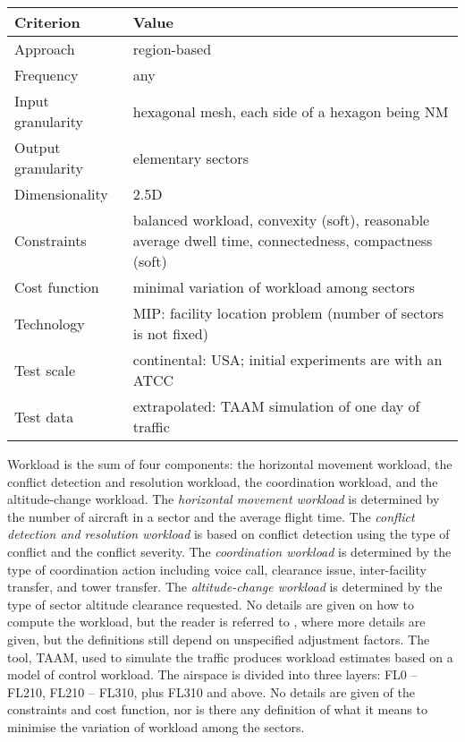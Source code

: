 \documentclass[a4paper,12pt]{article}
\begin{document}
\begin{center}
\begin{tabular}{|l|l|}
  \hline
  Criterion & Value \\
  \hline\hline
  Approach & region-based \\ \hline
  Frequency & any \\ \hline
  Input granularity & hexagonal mesh, each side of a hexagon
    being  NM \\ \hline
  Output granularity & elementary sectors \\ \hline
  Dimensionality & 2.5D \\ \hline
  Constraints & \parbox{11.5cm}{balanced workload, convexity (soft),
    reasonable average dwell time, connectedness, compactness (soft)} \\ \hline
  Cost function & minimal variation of workload among sectors \\ \hline
  Technology & MIP: facility location problem (number of sectors is
    not fixed) \\ \hline
  Test scale & continental: USA; initial experiments are with an
    ATCC \\ \hline
  Test data & extrapolated: TAAM simulation of one day of traffic \\ \hline
\end{tabular}
\end{center}
Workload is the sum of four components: the horizontal movement
workload, the conflict detection and resolution workload, the
coordination workload, and the altitude-change workload.  The
\emph{horizontal movement workload} is determined by the number of
aircraft in a sector and the average flight time.  The \emph{conflict
  detection and resolution workload} is based on conflict detection
using the type of conflict and the conflict severity.  The
\emph{coordination workload} is determined by the type of coordination
action including voice call, clearance issue, inter-facility transfer,
and tower transfer.  The \emph{altitude-change workload} is determined
by the type of sector altitude clearance requested.  No details are
given on how to compute the workload, but the reader is referred to
\cite{Yousefi:ATM03}, where more details are given, but the
definitions still depend on unspecified adjustment factors.  The tool,
TAAM, used to simulate the traffic produces workload estimates based
on a model of control workload.  The airspace is divided into three
layers: FL0 -- FL210, FL210 -- FL310, plus FL310 and above.
No details are given of the constraints and cost function, nor is
there any definition of what it means to minimise the variation of
workload among the sectors.
\end{document}
